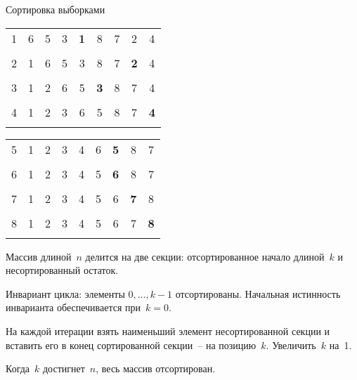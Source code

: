 \documentclass[landscape]{slides}
\begin{document}
\begin{slide}
  Сортировка выборками
  \begin{center}
    \renewcommand{\b}[1]{\textbf{#1}}
    \begin{tabular}{l|c|c|c|c|c|c|c|c|}
      \hhline{~|--------}
      1&	6&	5&	3&      \b{1}&  8&      7&      2&      4\\
      \hhline{~|--------}
      \multicolumn{9}{r}{}\\
      \hhline{~|=|-------}
      2&	1&      6&	5&	3&	8&      7&      \b{2}&  4\\
      \hhline{~|=|-------}
      \multicolumn{9}{r}{}\\
      \hhline{~|==|------}
      3&	1&      2&      6&	5&	\b{3}&	8&      7&      4\\
      \hhline{~|==|------}
      \multicolumn{9}{r}{}\\
      \hhline{~|===|-----}
      4&	1&      2&      3&	6&	5&	8&      7&      \b{4}\\
      \hhline{~|===|-----}
    \end{tabular}
    \qquad
    \begin{tabular}{l|c|c|c|c|c|c|c|c|}
      \hhline{~|====|----}
      5&	1&      2&      3&      4&	6&	\b{5}&	8&      7\\
      \hhline{~|====|----}
      \multicolumn{9}{r}{}\\
      \hhline{~|=====|---}
      6&	1&      2&      3&      4&	5&	\b{6}&	8&      7\\
      \hhline{~|=====|---}
      \multicolumn{9}{r}{}\\
      \hhline{~|======|--}
      7&	1&      2&      3&      4&	5&	6&	\b{7}&  8\\
      \hhline{~|======|--}
      \multicolumn{9}{r}{}\\
      \hhline{~|=======|-}
      8&	1&      2&      3&      4&	5&	6&	7&      \b{8}\\
      \hhline{~|=======|-}
    \end{tabular}
  \end{center}
  Массив длиной~$n$ делится на две секции: отсортированное начало длиной~$k$ и несортированный остаток.

  Инвариант цикла: элементы $0,\ldots,k-1$ отсортированы. Начальная истинность инварианта обеспечивается при~$k=0$.

  На каждой итерации взять наименьший элемент несортированной секции и вставить его в конец
  сортированной секции~-- на позицию~$k$. Увеличить~$k$ на~1.

  Когда~$k$ достигнет~$n$, весь массив отсортирован.
\end{slide}
\end{document}
